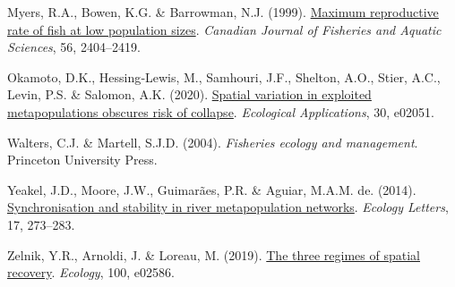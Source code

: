 \documentclass[
]{article}
\newlength{\cslhangindent}
\newlength{\cslentryspacingunit} %
\newenvironment{CSLReferences}[2] %
 {%
  \setlength{\parindent}{0pt}
  \ifodd #1
  \let\oldpar\par
  \def\par{\hangindent=\cslhangindent\oldpar}
  \fi
  \setlength{\parskip}{#2\cslentryspacingunit}
 }%
 {}
\begin{document}
\begin{CSLReferences}{1}{0}
\leavevmode{}%
Myers, R.A., Bowen, K.G. \& Barrowman, N.J. (1999).
\href{https://doi.org/10.1139/f99-201}{{Maximum reproductive rate of
fish at low population sizes}}. \emph{Canadian Journal of Fisheries and
Aquatic Sciences}, 56, 2404--2419.

\leavevmode{}%
Okamoto, D.K., Hessing‐Lewis, M., Samhouri, J.F., Shelton, A.O., Stier,
A.C., Levin, P.S. \& Salomon, A.K. (2020).
\href{https://doi.org/10.1002/eap.2051}{{Spatial variation in exploited
metapopulations obscures risk of collapse}}. \emph{Ecological
Applications}, 30, e02051.

\leavevmode{}%
Walters, C.J. \& Martell, S.J.D. (2004). \emph{{Fisheries ecology and
management}}. Princeton University Press.

\leavevmode{}%
Yeakel, J.D., Moore, J.W., Guimarães, P.R. \& Aguiar, M.A.M. de. (2014).
\href{https://doi.org/10.1111/ele.12228}{{Synchronisation and stability
in river metapopulation networks}}. \emph{Ecology Letters}, 17,
273--283.

\leavevmode{}%
Zelnik, Y.R., Arnoldi, J. \& Loreau, M. (2019).
\href{https://doi.org/10.1002/ecy.2446}{{The three regimes of spatial
recovery}}. \emph{Ecology}, 100, e02586.

\end{CSLReferences}
\end{document}
